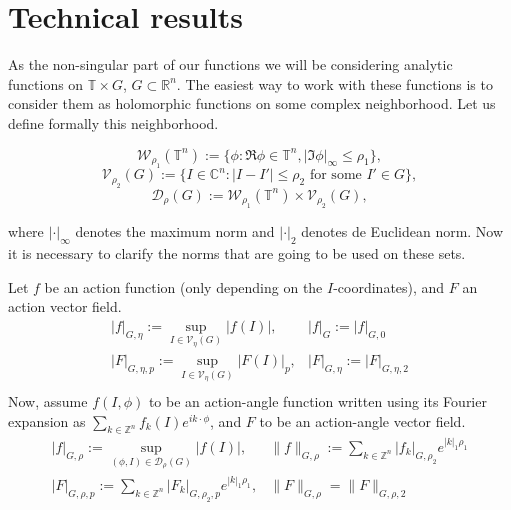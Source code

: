 


\section{Technical results}


As the non-singular part of our functions we will be considering analytic functions on $\mathbb{T}\times G$, $G \subset \mathbb{R}^n$. The easiest way to work with these functions is to consider them as holomorphic functions on some complex neighborhood. Let us define formally this neighborhood.

$$\mathcal{W}_{\rho_1}(\mathbb{T}^n) := \{ \phi : \Re\phi \in \mathbb{T}^n, |\Im \phi|_{\infty} \leq \rho_1\},$$
$$\mathcal{V}_{\rho_2}(G) := \{I \in \mathbb{C}^n : |I - I'|\leq \rho_2 \text{ for some } I' \in G\},$$
$$\mathcal{D}_\rho (G) := \mathcal{W}_{\rho_1}(\mathbb{T}^n) \times \mathcal{V}_{\rho_2}(G),$$

where $|\cdot|_\infty$ denotes the maximum norm and $|\cdot|_2$ denotes de Euclidean norm.
Now it is necessary to clarify the norms that are going to be used on these sets.

\begin{definition}
Let $f$ be an action function (only depending on the $I$-coordinates), and $F$ an action vector field.
$$
\begin{array}{rl}
|f|_{G,\eta} := \sup_{I\in\mathcal{V}_\eta(G)} |f(I)|,  & |f|_G := |f|_{G,0}\\
|F|_{G,\eta,p} := \sup_{I\in\mathcal{V}_\eta(G)} |F(I)|_p,  & |F|_{G,\eta} := |F|_{G,\eta,2}\\

\end{array}
$$
Now, assume $f(I,\phi)$ to be an action-angle function written using its Fourier expansion as $\sum_{k\in\mathbb{Z}^n} f_k(I)e^{ik\cdot\phi}$, and $F$ to be an action-angle vector field.
$$
\begin{array}{rcl}
|f|_{G,\rho} := \sup_{(\phi,I)\in\mathcal{D}_\rho(G)} |f(I)|, & \|f\|_{G,\rho}:=\sum_{k\in\mathbb{Z}^n} |f_k|_{G,\rho_2} e^{|k|_1\rho_1}\\
|F|_{G,\rho,p} := \sum_{k\in\mathbb{Z}^n} |F_k|_{G,\rho_2,p} e^{|k|_1\rho_1}, & \|F\|_{G,\rho} = \|F\|_{G,\rho,2}\\
\end{array}
$$
\end{definition}

